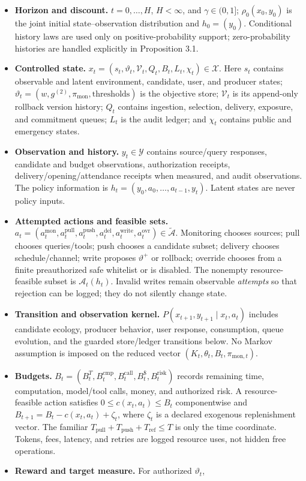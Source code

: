 \documentclass[
  11pt]{article}
\begin{document}
\begin{itemize}
\item
  \textbf{Horizon and discount.} \(t=0,\ldots,H\), \(H<\infty\), and
  \(\gamma\in(0,1]\); \(\rho_0(x_0,y_0)\) is the joint initial
  state--observation distribution and \(h_0=(y_0)\). Conditional history
  laws are used only on positive-probability support; zero-probability
  histories are handled explicitly in Proposition 3.1.
\item
  \textbf{Controlled state.}
  \(x_t=(s_t,\vartheta_t,\mathcal V_t,Q_t,B_t,L_t,\chi_t)\in\mathcal X\).
  Here \(s_t\) contains observable and latent environment, candidate,
  user, and producer states;
  \(\vartheta_t=(w,g^{(2)},\pi_{\mathrm{mon}},\mathrm{thresholds})\) is
  the objective store; \(\mathcal V_t\) is its append-only rollback
  version history; \(Q_t\) contains ingestion, selection, delivery,
  exposure, and commitment queues; \(L_t\) is the audit ledger; and
  \(\chi_t\) contains public and emergency states.
\item
  \textbf{Observation and history.} \(y_t\in\mathcal Y\) contains
  source/query responses, candidate and budget observations,
  authorization receipts, delivery/opening/attendance receipts when
  measured, and audit observations. The policy information is
  \(h_t=(y_0,a_0,\ldots,a_{t-1},y_t)\). Latent states are never policy
  inputs.
\item
  \textbf{Attempted actions and feasible sets.}
  \(a_t=(a_t^{\mathrm{mon}},a_t^{\mathrm{pull}},a_t^{\mathrm{push}},a_t^{\mathrm{del}},a_t^{\mathrm{write}},a_t^{\mathrm{ovr}})\in\widetilde{\mathcal A}\).
  Monitoring chooses sources; pull chooses queries/tools; push chooses a
  candidate subset; delivery chooses schedule/channel; write proposes
  \(\vartheta^+\) or rollback; override chooses from a finite
  preauthorized safe whitelist or is disabled. The nonempty
  resource-feasible subset is \(\mathcal A_t(h_t)\). Invalid writes
  remain observable \emph{attempts} so that rejection can be logged;
  they do not silently change state.
\item
  \textbf{Transition and observation kernel.}
  \(P(x_{t+1},y_{t+1}\mid x_t,a_t)\) includes candidate ecology,
  producer behavior, user response, consumption, queue evolution, and
  the guarded store/ledger transitions below. No Markov assumption is
  imposed on the reduced vector
  \((K_t,\theta_t,B_t,\pi_{\mathrm{mon},t})\).
\item
  \textbf{Budgets.}
  \(B_t=(B_t^T,B_t^{\mathrm{cmp}},B_t^{\mathrm{call}},B_t^{\$},B_t^{\mathrm{risk}})\)
  records remaining time, computation, model/tool calls, money, and
  authorized risk. A resource-feasible action satisfies
  \(0\le c(x_t,a_t)\le B_t\) componentwise and
  \(B_{t+1}=B_t-c(x_t,a_t)+\zeta_t\), where \(\zeta_t\) is a declared
  exogenous replenishment vector. The familiar
  \(T_{\mathrm{pull}}+T_{\mathrm{push}}+T_{\mathrm{ref}}\le T\) is only
  the time coordinate. Tokens, fees, latency, and retries are logged
  resource uses, not hidden free operations.
\item
  \textbf{Reward and target measure.} For authorized \(\vartheta_t\),


\end{itemize}
\end{document}
